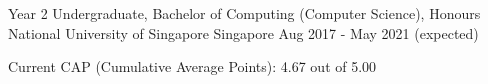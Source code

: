 

\begin{cventries}

  \cventry
    {Year 2 Undergraduate, Bachelor of Computing (Computer Science), Honours} %
    {National University of Singapore} %
    {Singapore} %
    {Aug 2017 - May 2021 (expected)} %
    {
      \begin{cvitems} %
        \item {Current CAP (Cumulative Average Points): 4.67 out of 5.00}
      \end{cvitems}
    }
    
    


\end{cventries}
